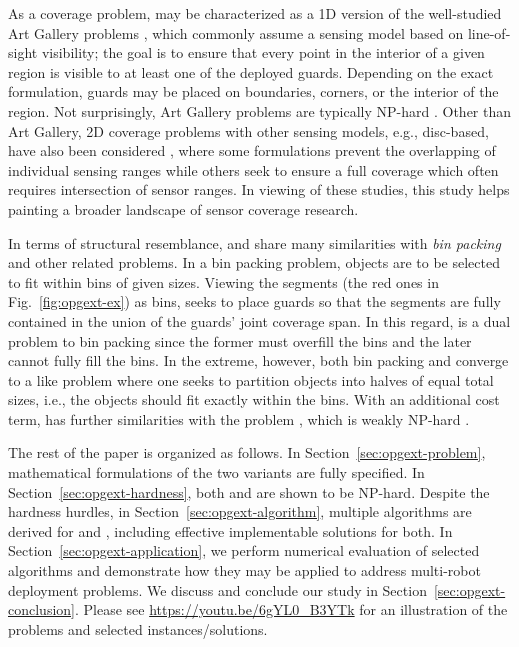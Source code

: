 As a coverage problem, \opg may be characterized as a 1D version 
of the well-studied Art Gallery problems  \cite{o1987art,shermer1992recent},
which commonly assume a sensing model based on line-of-sight 
visibility\cite{lozano1979algorithm}; the goal is to ensure that every point
in the  interior of a given region is visible to at least one of the deployed 
guards. Depending on the exact formulation, guards may be placed on 
boundaries, corners, or the interior of the region. Not surprisingly, Art
Gallery problems are typically NP-hard \cite{lee1986computational}. Other
than Art Gallery, 2D coverage problems with other sensing models, e.g., 
disc-based, have also been considered \cite{thue1910dichteste,hales2005proof,
drezner1995facility,cortes2004coverage,pavone2009equitable
,pierson2017adapting}, where some formulations prevent the overlapping 
of individual sensing ranges \cite{thue1910dichteste,hales2005proof} while 
others seek to ensure a full coverage which often requires intersection
of sensor ranges. 
%
In viewing of these studies, this study helps painting a broader landscape 
of sensor coverage research.

In terms of structural resemblance, \opglr and \opgmc share many similarities 
with {\em bin packing}  \cite{johnson1973near} and other related problems. 
In a bin packing problem, objects are to be selected to fit within bins of 
given sizes. Viewing the segments (the red ones in Fig.~\ref{fig:opgext-ex}) as 
bins, \opg seeks to place guards so that the segments are fully contained in 
the union of the guards' joint coverage span. In this regard, \opg is a dual
problem to bin packing since the former must overfill the bins and the later 
cannot fully fill the bins. In the extreme, however, both bin packing and 
\opg converge to a \subsetsum \cite{karp1972reducibility} like problem where 
one seeks to partition objects into halves of equal total sizes, i.e., the 
objects should fit exactly within the bins. With an additional cost term, 
\opgmc has further similarities with the \ttkp problem \cite{ukphardness}, 
which is weakly NP-hard \cite{dantzig1957discrete}.

The rest of the paper is organized as follows. In Section~\ref{sec:opgext-problem},
mathematical formulations of the two \opg variants are fully specified. In
Section~\ref{sec:opgext-hardness}, both \opglr and \opgmc are shown to be 
NP-hard. Despite the hardness hurdles, in Section~\ref{sec:opgext-algorithm}, 
multiple algorithms are derived for \opglr and \opgmc, including effective
implementable solutions for both. In Section~\ref{sec:opgext-application},
we perform numerical evaluation of selected algorithms and demonstrate 
how they may be applied to address multi-robot deployment problems. We 
discuss and conclude our study in Section~\ref{sec:opgext-conclusion}. Please
see \url{https://youtu.be/6gYL0_B3YTk} for an illustration of the problems 
and selected instances/solutions. 